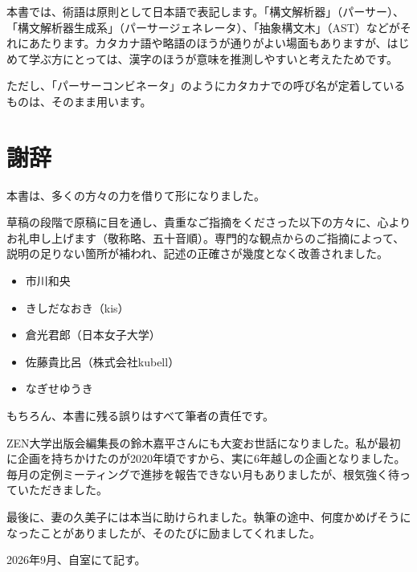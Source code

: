 本書では、術語は原則として日本語で表記します。「構文解析器」（パーサー）、「構文解析器生成系」（パーサージェネレータ）、「抽象構文木」（AST）などがそれにあたります。カタカナ語や略語のほうが通りがよい場面もありますが、はじめて学ぶ方にとっては、漢字のほうが意味を推測しやすいと考えたためです。

ただし、「パーサーコンビネータ」のようにカタカナでの呼び名が定着しているものは、そのまま用います。

\section*{謝辞}

本書は、多くの方々の力を借りて形になりました。

草稿の段階で原稿に目を通し、貴重なご指摘をくださった以下の方々に、心よりお礼申し上げます（敬称略、五十音順）。専門的な観点からのご指摘によって、説明の足りない箇所が補われ、記述の正確さが幾度となく改善されました。

\begin{itemize}
\item
  市川和央
\item
  きしだなおき（kis）
\item
  倉光君郎（日本女子大学）
\item
  佐藤貴比呂（株式会社kubell）
\item
  なぎせゆうき
\end{itemize}

もちろん、本書に残る誤りはすべて筆者の責任です。

ZEN大学出版会編集長の鈴木嘉平さんにも大変お世話になりました。私が最初に企画を持ちかけたのが2020年頃ですから、実に6年越しの企画となりました。毎月の定例ミーティングで進捗を報告できない月もありましたが、根気強く待っていただきました。

最後に、妻の久美子には本当に助けられました。執筆の途中、何度かめげそうになったことがありましたが、そのたびに励ましてくれました。

\bigskip

\begin{flushright}
  2026年9月、自室にて記す。
\end{flushright}
